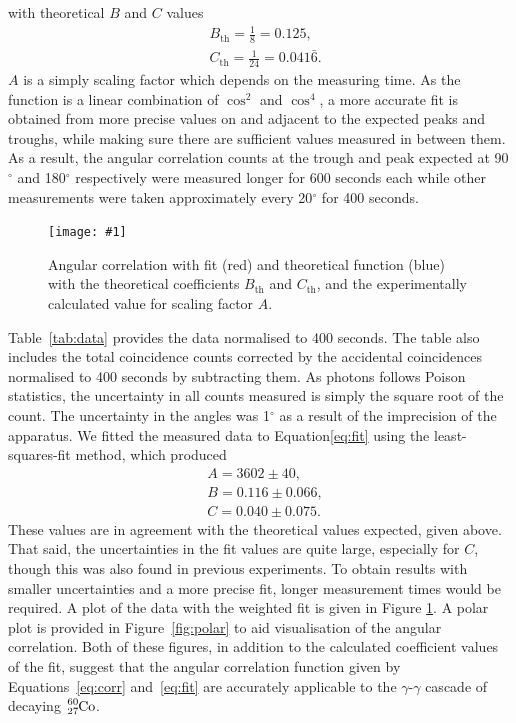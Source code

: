 \documentclass[twocolumn]{article}
\newcommand{\insertFigure}[1]{%
   \texttt{[image: \#1]}%
}
\begin{document}
with theoretical $B$ and $C$ values\cite{sieg}
\begin{align*}
&B_{\text{th}} = \frac{1}{8} = 0.125,\\
&C_{\text{th}} = \frac{1}{24} = 0.041\bar{6}.
\end{align*}
$A$ is a simply scaling factor which depends on the measuring time. As the function is a linear combination of $\cos^2$ and $\cos^4$, a more accurate fit is obtained from more precise values on and adjacent to the expected peaks and troughs, while making sure there are sufficient values measured in between them. As a result, the angular correlation counts at the trough and peak expected at 90$^{\circ}$ and 180$^{\circ}$ respectively were measured longer for 600 seconds each while other measurements were taken approximately every 20$^{\circ}$ for 400 seconds. 
\begin{figure} [!h]
	\centering
	\insertFigure{angular.png}
	\caption{Angular correlation with fit (red) and theoretical function (blue) with the theoretical coefficients $B_{\text{th}}$ and $C_{\text{th}}$, and the experimentally calculated value for scaling factor $A$.}
	\label{fig:angular}
\end{figure}
Table~\ref{tab:data} provides the data normalised to 400 seconds. The table also includes the total coincidence counts corrected by the accidental coincidences normalised to 400 seconds by subtracting them. As photons follows Poison statistics, the uncertainty in all counts measured is simply the square root of the count. The uncertainty in the angles was 1$^\circ$ as a result of the imprecision of the apparatus. We fitted the measured data to Equation\ref{eq:fit} using the least-squares-fit method, which produced
\begin{align*}
&A = 3602 \pm 40,\\
&B = 0.116  \pm 0.066,\\
&C = 0.040 \pm 0.075.
\end{align*}
These values are in agreement with the theoretical values expected, given above. That said, the uncertainties in the fit values are quite large, especially for $C$, though this was also found in previous experiments.\cite{meliss} To obtain results with smaller uncertainties and a more precise fit, longer measurement times would be required. A plot of the data with the weighted fit is given in Figure \ref{fig:angular}. A polar plot is provided in Figure~\ref{fig:polar} to aid visualisation of the angular correlation. Both of these figures, in addition to the calculated coefficient values of the fit, suggest that the angular correlation function given by Equations~\ref{eq:corr} and~\ref{eq:fit} are accurately applicable to the $\gamma$-$\gamma$ cascade of decaying $\ce{_27^{60}Co}$.
\end{document}
